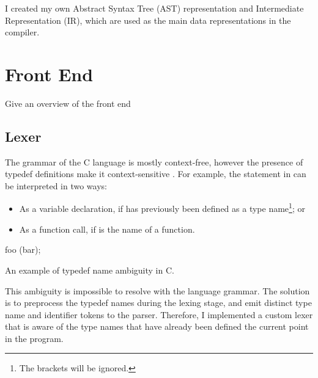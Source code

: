 \documentclass[00-main.tex]{subfiles}
\begin{document}
I created my own Abstract Syntax Tree (AST) representation and Intermediate Representation (IR), which are used as the main data representations in the compiler.


\section{Front End}

\begin{Comment}
Give an overview of the front end
\end{Comment}

\subsection{Lexer}

The grammar of the C language is mostly context-free, however the presence of typedef definitions make it context-sensitive .
For example, the statement in  can be interpreted in two ways:
\begin{itemize}
\item As a variable declaration, if  has previously been defined as a type name\footnote{The brackets will be ignored.}; or
\item As a function call, if  is the name of a function.
\end{itemize}

\begin{listing}[H]
  \begin{CListing}
  foo (bar);
  \end{CListing}
  \caption{An example of typedef name ambiguity in C.}
  \label{lst:typedef name ambiguity example}
\end{listing}

This ambiguity is impossible to resolve with the language grammar. The solution is to preprocess the typedef names during the lexing stage, and emit distinct type name and identifier tokens to the parser.
Therefore, I implemented a custom lexer that is aware of the type names that have already been defined the current point in the program.
\end{document}
